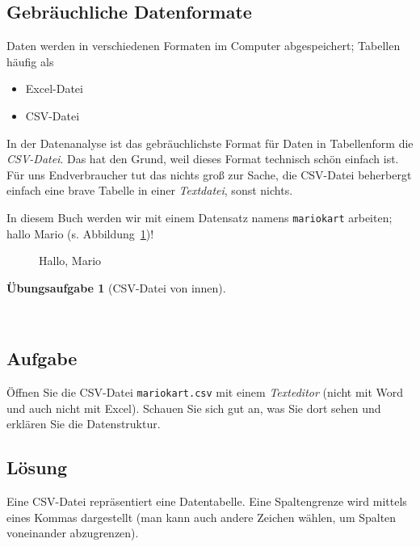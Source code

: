 \documentclass[
  a4paper,
  DIV=11]{scrreprt}
\providecommand{\tightlist}{%
  \setlength{\itemsep}{0pt}\setlength{\parskip}{0pt}}\usepackage{longtable,booktabs,array}
\theoremstyle{definition}
\newtheorem{exercise}{Übungsaufgabe}[chapter]
\theoremstyle{definition}
\theoremstyle{definition}
\theoremstyle{remark}
\begin{document}
\subsection{Gebräuchliche
Datenformate}\label{gebruxe4uchliche-datenformate}

Daten werden in verschiedenen Formaten im Computer abgespeichert;
Tabellen häufig als

\begin{itemize}
\tightlist
\item
  Excel-Datei
\item
  CSV-Datei
\end{itemize}

In der Datenanalyse ist das gebräuchlichste Format für Daten in
Tabellenform die \emph{CSV-Datei}. Das hat den Grund, weil dieses Format
technisch schön einfach ist. Für uns Endverbraucher tut das nichts groß
zur Sache, die CSV-Datei beherbergt einfach eine brave Tabelle in einer
\emph{Textdatei}, sonst nichts.

In diesem Buch werden wir mit einem Datensatz namens \texttt{mariokart}
arbeiten; hallo Mario (s. Abbildung~\ref{fig-mario})!

\begin{figure}


\caption{\label{fig-mario}Hallo, Mario}

\end{figure}%

\begin{exercise}[CSV-Datei von
innen]\protect\hypertarget{exr-texteditor}{}\label{exr-texteditor}

~

\subsection{Aufgabe}

Öffnen Sie die CSV-Datei \texttt{mariokart.csv} mit einem
\emph{Texteditor} (nicht mit Word und auch nicht mit Excel). Schauen Sie
sich gut an, was Sie dort sehen und erklären Sie die Datenstruktur.

\subsection{Lösung}

Eine CSV-Datei repräsentiert eine Datentabelle. Eine Spaltengrenze wird
mittels eines Kommas dargestellt (man kann auch andere Zeichen wählen,
um Spalten voneinander abzugrenzen).

\end{exercise}
\end{document}
